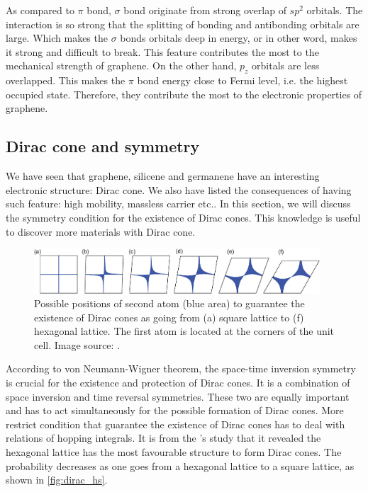 As compared to $\pi$ bond, $\sigma$ bond originate from strong overlap of $sp^2$ orbitals. The interaction is so strong that the splitting of bonding and antibonding orbitals are large. Which makes the $\sigma$ bonds orbitals deep in energy, or in other word, makes it strong and difficult to break. This feature contributes the most to the mechanical strength of graphene. On the other hand, $p_z$ orbitals are less overlapped. This makes the $\pi$ bond energy close to Fermi level, i.e. the highest occupied state. Therefore, they contribute the most to the electronic properties of graphene.  


\subsection{Dirac cone and symmetry}

We have seen that graphene, silicene and germanene have an interesting electronic structure: Dirac cone. We also have listed the consequences of having such feature: high mobility, massless carrier etc.. In this section, we will discuss the symmetry condition for the existence of Dirac cones. This knowledge is useful to discover more materials with Dirac cone. 
\begin{figure}[htbp!] 
\centering  
\includegraphics[width=0.95\textwidth]{dirac_hs.png}
\caption{Possible positions of second atom (blue area) to guarantee the existence of Dirac cones as going from (a) square lattice to (f) hexagonal lattice. The first atom is located at the corners of the unit cell. Image source: \cite{Liu2013}. }  
\label{fig:dirac_hs}
\end{figure} 
According to von Neumann-Wigner theorem, the space-time inversion symmetry is crucial for the existence and protection of Dirac cones\cite{Wang2015b}. It is a combination of space inversion and time reversal symmetries. These two are equally important and has to act simultaneously for the possible formation of Dirac cones. More restrict condition that guarantee the existence of Dirac cones has to deal with relations of hopping integrals\cite{Hasegawa2006,Liu2013}. It is from the \citet{Liu2013}'s study that it revealed the hexagonal lattice has the most favourable structure to form Dirac cones. The probability decreases as one goes from a hexagonal lattice to a square lattice, as shown in \autoref{fig:dirac_hs}.

